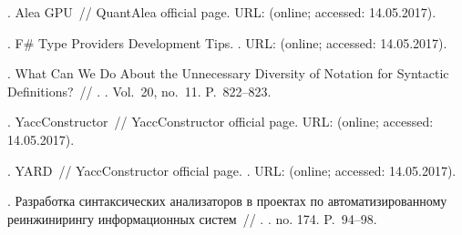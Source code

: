 \begin{thebibliography}{10}
. Alea GPU~// QuantAlea official page. \BibDash
\newblock URL:  (online; accessed:
  14.05.2017).

. F\# Type Providers Development Tips. \BibDash
{}. \BibDash
\newblock URL:
  (online; accessed: 14.05.2017).

. What Can We Do About the Unnecessary Diversity of
  Notation for Syntactic Definitions?~// . \BibDash
{}. \BibDash
\newblock Vol.~20, no.~11. \BibDash
\newblock P.~822--823.

. YaccConstructor~// YaccConstructor official page.
  \BibDash
\newblock URL:  (online; accessed:
  14.05.2017).

. YARD~// YaccConstructor official page. \BibDash
{}. \BibDash
\newblock URL:
   (online;
  accessed: 14.05.2017).

. Разработка синтаксических
  анализаторов в проектах по
  автоматизированному реинжинирингу
  информационных систем~//
  . \BibDash
{}. \BibDash
\newblock no. 174. \BibDash
\newblock P.~94--98.

\end{thebibliography}
